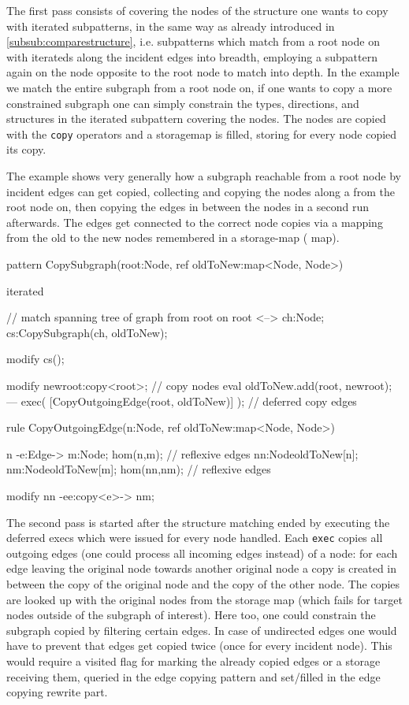The first pass consists of covering the nodes of the structure one wants to copy with iterated subpatterns,
in the same way as already introduced in \ref{subsub:comparestructure},
i.e. subpatterns which match from a root node on with iterateds along the incident edges into breadth,
employing a subpattern again on the node opposite to the root node to match into depth.
In the example we match the entire subgraph from a root node on, if one wants to copy a more constrained subgraph one can simply constrain the types, directions, and structures in the iterated subpattern covering the nodes.
The nodes are copied with the \texttt{copy} operators and a storagemap is filled, storing for every node copied its copy.

  \begin{example}
The example shows very generally how a subgraph reachable from a root node by incident edges can get copied, collecting and copying the nodes along a  from the root node on, then copying the edges in between the nodes in a second run afterwards. The edges get connected to the correct node copies via a mapping from the old to the new nodes remembered in a storage-map ( map).
    \begin{grgen}
pattern CopySubgraph(root:Node, ref oldToNew:map<Node, Node>)
{
  iterated { // match spanning tree of graph from root on
    root <--> ch:Node;
    cs:CopySubgraph(ch, oldToNew);

    modify {
      cs();
    }
  }

  modify {
    newroot:copy<root>; // copy nodes
    eval { oldToNew.add(root, newroot); }
  ---
    exec( [CopyOutgoingEdge(root, oldToNew)] ); // deferred copy edges
  }
}

rule CopyOutgoingEdge(n:Node, ref oldToNew:map<Node, Node>)
{
  n -e:Edge-> m:Node;
  hom(n,m); // reflexive edges
  nn:Node{oldToNew[n]}; nm:Node{oldToNew[m]};
  hom(nn,nm); // reflexive edges

  modify {
    nn -ee:copy<e>-> nm;
  }
}
    \end{grgen}
  \end{example}

The second pass is started after the structure matching ended by executing the deferred execs which were issued for every node handled.
Each \texttt{exec} copies all outgoing edges (one could process all incoming edges instead) of a node:
for each edge leaving the original node towards another original node a copy is created in between the copy of the original node and the copy of the other node.
The copies are looked up with the original nodes from the storage map (which fails for target nodes outside of the subgraph of interest).
Here too, one could constrain the subgraph copied by filtering certain edges.
In case of undirected edges one would have to prevent that edges get copied twice (once for every incident node). This would require a visited flag for marking the already copied edges or a storage receiving them, queried in the edge copying pattern and set/filled in the edge copying rewrite part.


